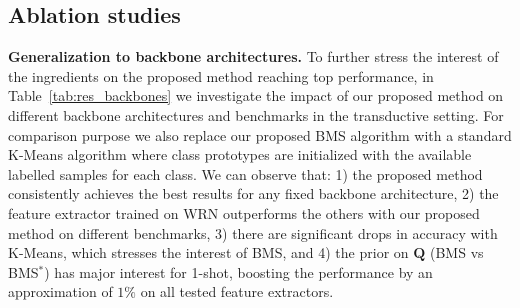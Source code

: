 \documentclass[review]{elsarticle}
\begin{document}
\begin{table}[h!]
    \caption{1-shot and 5-shot accuracy of state-of-the-art methods when performing cross-domain classification (backbone: WRN).}
    \centering
    \label{tab:results_cross}
\end{table}

\subsection{Ablation studies}

\textbf{Generalization to backbone architectures.} To further stress the interest of the ingredients on the proposed method reaching top performance, in Table~\ref{tab:res_backbones} we investigate the impact of our proposed method on different backbone architectures and benchmarks in the transductive setting. For comparison purpose we also replace our proposed BMS algorithm with a standard K-Means algorithm where class prototypes are initialized with the available labelled samples for each class. We can observe that: 1) the proposed method consistently achieves the best results for any fixed backbone architecture, 2) the feature extractor trained on WRN outperforms the others with our proposed method on different benchmarks, 3) there are significant drops in accuracy with K-Means, which stresses the interest of BMS, and 4) the prior on $\mathbf{Q}$ (BMS vs BMS$^*$) has major interest for 1-shot, boosting the performance by an approximation of $1\%$ on all tested feature extractors.
\end{document}
